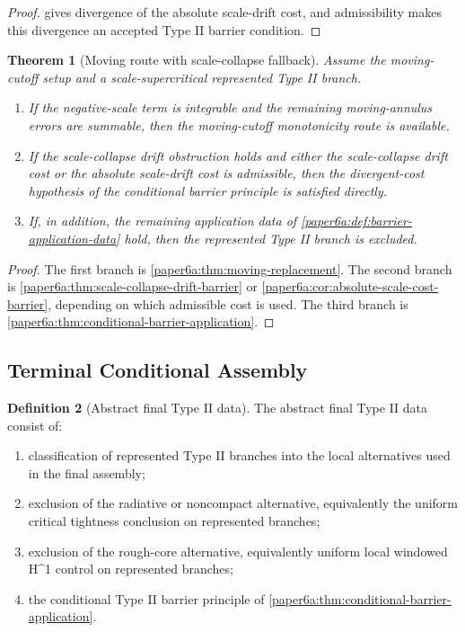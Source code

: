 \documentclass[11pt]{amsart}
\def\({}%
\def\){}%
\theoremstyle{plain}
\newtheorem{theorem}{Theorem}[section]
\theoremstyle{definition}
\newtheorem{definition}[theorem]{Definition}
\theoremstyle{remark}
\begin{document}
\begin{proof}
 gives divergence of the absolute
scale-drift cost, and admissibility makes this divergence an accepted Type II
barrier condition.
\end{proof}

\begin{theorem}[Moving route with scale-collapse fallback]
\label{paper6a:thm:moving-route-scale-fallback}
Assume the moving-cutoff setup and a scale-supercritical represented Type II
branch.
\begin{enumerate}[label=\textup{(\roman*)}]
\item If the negative-scale term is integrable and the remaining moving-annulus
errors are summable, then the moving-cutoff monotonicity route is available.
\item If the scale-collapse drift obstruction holds and either the
scale-collapse drift cost or the absolute scale-drift cost is admissible, then
the divergent-cost hypothesis of the conditional barrier principle is
satisfied directly.
\item If, in addition, the remaining application data of
\cref{paper6a:def:barrier-application-data} hold, then the represented Type II
branch is excluded.
\end{enumerate}
\end{theorem}

\begin{proof}
The first branch is \cref{paper6a:thm:moving-replacement}.  The second branch
is \cref{paper6a:thm:scale-collapse-drift-barrier} or
\cref{paper6a:cor:absolute-scale-cost-barrier}, depending on which admissible
cost is used.  The third branch is
\cref{paper6a:thm:conditional-barrier-application}.
\end{proof}

\subsection{Terminal Conditional Assembly}

\begin{definition}[Abstract final Type II data]\label{paper6a:def:abstract-final-data}
The abstract final Type II data consist of:
\begin{enumerate}[label=\textup{(\roman*)}]
\item classification of represented Type II branches into the local alternatives
used in the final assembly;
\item exclusion of the radiative or noncompact alternative, equivalently the
uniform critical tightness conclusion on represented branches;
\item exclusion of the rough-core alternative, equivalently uniform local
windowed \(H^1\) control on represented branches;
\item the conditional Type II barrier principle of
\cref{paper6a:thm:conditional-barrier-application}.
\end{enumerate}
\end{definition}
\end{document}
